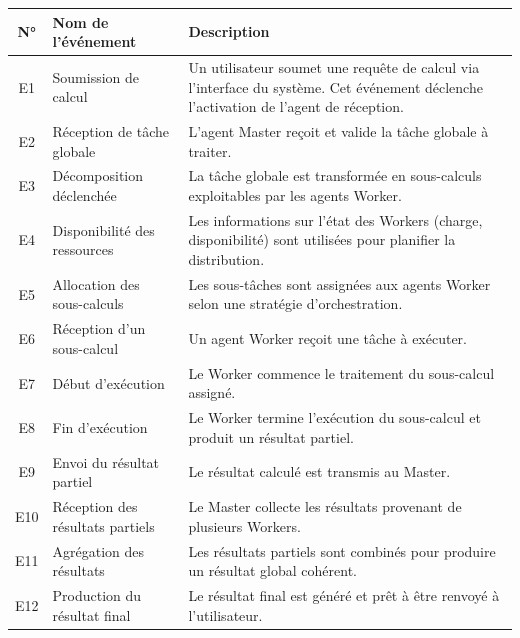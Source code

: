 \documentclass[12pt,a4paper]{report}
\theoremstyle{definition}
\begin{document}
\begin{table}[H]
\centering
\renewcommand{\arraystretch}{1.3}
\begin{tabular}{|c|p{4cm}|p{9cm}|}
\hline
\textbf{N°} & \textbf{Nom de l’événement} & \textbf{Description} \\
\hline

E1 & Soumission de calcul & Un utilisateur soumet une requête de calcul via l’interface du système. Cet événement déclenche l’activation de l’agent de réception. \\
\hline

E2 & Réception de tâche globale & L’agent Master reçoit et valide la tâche globale à traiter. \\
\hline

E3 & Décomposition déclenchée & La tâche globale est transformée en sous-calculs exploitables par les agents Worker. \\
\hline

E4 & Disponibilité des ressources & Les informations sur l’état des Workers (charge, disponibilité) sont utilisées pour planifier la distribution. \\
\hline

E5 & Allocation des sous-calculs & Les sous-tâches sont assignées aux agents Worker selon une stratégie d’orchestration. \\
\hline

E6 & Réception d’un sous-calcul & Un agent Worker reçoit une tâche à exécuter. \\
\hline

E7 & Début d’exécution & Le Worker commence le traitement du sous-calcul assigné. \\
\hline

E8 & Fin d’exécution & Le Worker termine l’exécution du sous-calcul et produit un résultat partiel. \\
\hline

E9 & Envoi du résultat partiel & Le résultat calculé est transmis au Master. \\
\hline

E10 & Réception des résultats partiels & Le Master collecte les résultats provenant de plusieurs Workers. \\
\hline

E11 & Agrégation des résultats & Les résultats partiels sont combinés pour produire un résultat global cohérent. \\
\hline

E12 & Production du résultat final & Le résultat final est généré et prêt à être renvoyé à l’utilisateur. \\
\hline


\end{tabular}
\end{table}
\end{document}
